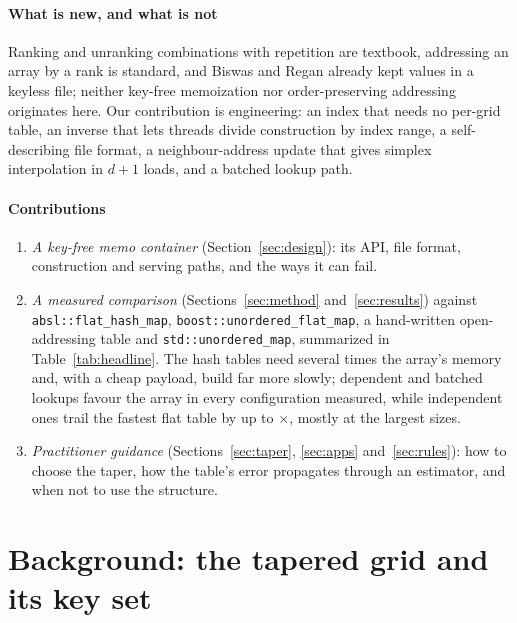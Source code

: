 \documentclass[preprint,12pt]{elsarticle}
\newcommand{\absl}{\texttt{absl::\allowbreak flat\_\allowbreak hash\_\allowbreak map}}
\newcommand{\umap}{\texttt{std::\allowbreak unordered\_\allowbreak map}}
\newcommand{\bflat}{\texttt{boost::\allowbreak unordered\_\allowbreak flat\_\allowbreak map}}
\begin{document}
\paragraph{What is new, and what is not} Ranking and unranking combinations with
repetition are textbook,\cite{lehmer1964,buckles1977,knuth2011,kreher1999}
addressing an array by a rank is standard,\cite{jacobson1989,raman2007} and
Biswas and Regan already kept values in a keyless file; neither key-free
memoization nor order-preserving addressing originates here. Our contribution is
engineering: an index that needs no per-grid table, an inverse that lets threads
divide construction by index range, a self-describing file format, a neighbour-address update that gives
simplex interpolation in $d{+}1$ loads, and a batched lookup path.

\paragraph{Contributions}
\begin{enumerate}
\item \emph{A key-free memo container} (Section~\ref{sec:design}): its API, file
format, construction and serving paths, and the ways it can fail.
\item \emph{A measured comparison} (Sections~\ref{sec:method}
and~\ref{sec:results}) against \absl{}, \bflat{}, a hand-written open-addressing
table and \umap{}, summarized in Table~\ref{tab:headline}. The hash tables need several times the array's memory and, with a cheap payload, build far more slowly; dependent and batched lookups favour the array in every configuration measured, while independent ones trail the fastest flat table by up to \hAllIndWorst$\times$, mostly at the largest sizes.

\item \emph{Practitioner guidance} (Sections~\ref{sec:taper}, \ref{sec:apps}
and~\ref{sec:rules}): how to choose the taper, how the table's error propagates
through an estimator, and when not to use the structure.
\end{enumerate}

\section{Background: the tapered grid and its key set}\label{sec:background}
\end{document}

